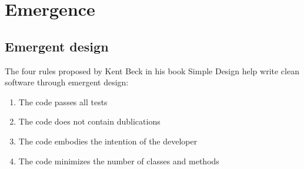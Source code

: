 \section{Emergence}

\subsection{Emergent design}
The four rules proposed by Kent Beck in his book Simple Design \cite{XPE} help write clean software through emergent design:

\begin{enumerate}
    \item The code passes all tests
    \item The code does not contain dublications
    \item The code embodies the intention of the developer
    \item The code minimizes the number of classes and methods
\end{enumerate}

